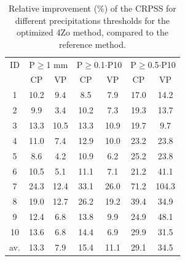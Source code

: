 \documentclass[review]{elsarticle}
\begin{document}
\begin{table}[t]
	\caption{Relative improvement (\%) of the CRPSS for different precipitations thresholds for the optimized 4Zo method, compared to the reference method.}
	\footnotesize
	\begin{center}
		\begin{tabular}{ccccccc}
			\hline 
			ID & \multicolumn{2}{c}{P\(\geq\)1 mm} & \multicolumn{2}{c}{P\(\geq\)0.1\(\cdot\)P10} & \multicolumn{2}{c}{P\(\geq\)0.5\(\cdot\)P10} \\ 
			& CP & VP & CP & VP & CP & VP \\ 
			\hline 
			1 & 10.2 & 9.4 & 8.5 & 7.9 & 17.0 & 14.2 \\ 
			2 & 9.9 & 3.4 & 10.2 & 7.3 & 19.3 & 13.7 \\ 
			3 & 13.3 & 10.5 & 13.3 & 10.9 & 19.7 & 9.7 \\ 
			4 & 11.0 & 7.4 & 12.9 & 10.0 & 23.2 & 23.8 \\ 
			5 & 8.6 & 4.2 & 10.9 & 6.2 & 25.2 & 23.8 \\ 
			6 & 10.5 & 5.1 & 11.1 & 7.1 & 21.2 & 41.1 \\ 
			7 & 24.3 & 12.4 & 33.1 & 26.0 & 71.2 & 104.3 \\ 
			8 & 19.0 & 12.7 & 26.2 & 19.2 & 39.4 & 34.9 \\ 
			9 & 12.4 & 6.8 & 13.8 & 9.9 & 24.9 & 48.1 \\ 
			10 & 13.6 & 6.8 & 14.4 & 6.9 & 29.9 & 31.5 \\ 
			\hline 
			av. & 13.3 & 7.9 & 15.4 & 11.1 & 29.1 & 34.5 \\ 
			\hline 
		\end{tabular} 
	\end{center}
	\label{table:scores_thresholds_4Zo}
\end{table}
\end{document}
